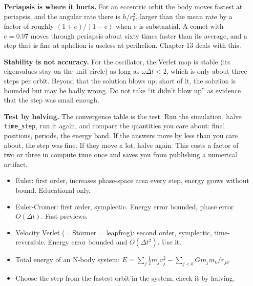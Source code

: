 \documentclass[
  10.5pt,
  letterpaper,
]{scrbook}
\providecommand{\tightlist}{%
  \setlength{\itemsep}{0pt}\setlength{\parskip}{0pt}}
\theoremstyle{definition}
\theoremstyle{plain}
\theoremstyle{remark}
\begin{document}
\textbf{Periapsis is where it hurts.} For an eccentric orbit the body
moves fastest at periapsis, and the angular rate there is \(h/r_p^2\),
larger than the mean rate by a factor of roughly \((1+e)/(1-e)\) when
\(e\) is substantial. A comet with \(e = 0.97\) moves through periapsis
about sixty times faster than its average, and a step that is fine at
aphelion is useless at perihelion. Chapter 13 deals with this.

\textbf{Stability is not accuracy.} For the oscillator, the Verlet map
is stable (its eigenvalues stay on the unit circle) as long as
\(\omega\Delta t < 2\), which is only about three steps per orbit.
Beyond that the solution blows up; short of it, the solution is bounded
but may be badly wrong. Do not take ``it didn't blow up'' as evidence
that the step was small enough.

\textbf{Test by halving.} The convergence table is the test. Run the
simulation, halve \texttt{time\_step}, run it again, and compare the
quantities you care about: final positions, periods, the energy band. If
the answers move by less than you care about, the step was fine. If they
move a lot, halve again. This costs a factor of two or three in compute
time once and saves you from publishing a numerical artifact.

\begin{tcolorbox}[enhanced jigsaw, arc=.35mm, bottomrule=.15mm, bottomtitle=1mm, breakable, colback=white, colbacktitle=quarto-callout-tip-color!10!white, colframe=quarto-callout-tip-color-frame, coltitle=black, left=2mm, leftrule=.75mm, opacityback=0, opacitybacktitle=0.6, rightrule=.15mm, title={Key results}, titlerule=0mm, toprule=.15mm, toptitle=1mm]

\begin{itemize}
\tightlist
\item
  Euler: first order, increases phase-space area every step, energy
  grows without bound. Educational only.
\item
  Euler-Cromer: first order, symplectic. Energy error bounded, phase
  error \(O(\Delta t)\). Fast previews.
\item
  Velocity Verlet (= Störmer = leapfrog): second order, symplectic,
  time-reversible. Energy error bounded and \(O(\Delta t^2)\). Use it.
\item
  Total energy of an N-body system:
  \(E = \sum_j \tfrac12 m_j v_j^2 - \sum_{j<k} G m_j m_k / r_{jk}\).
\item
  Choose the step from the fastest orbit in the system, check it by
  halving.
\end{itemize}

\end{tcolorbox}
\end{document}
